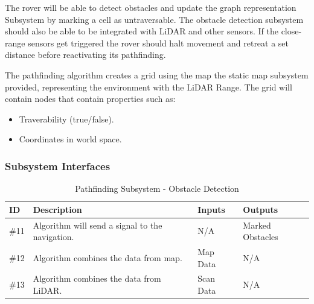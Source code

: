 The rover will be able to detect obstacles and update the graph representation Subsystem by marking a cell as untraversable. The obstacle detection subsystem should also be able to be integrated with LiDAR and other sensors. If the close-range sensors get triggered the rover should halt movement and retreat a set distance before reactivating its pathfinding.

The pathfinding algorithm creates a grid using the map the static map subsystem provided, representing the environment with the LiDAR Range. The grid will contain nodes that contain properties such as: 
\begin{itemize}
  \item Traverability (true/false).
  \item Coordinates in world space.
\end{itemize}
\subsubsection{Subsystem Interfaces}


\begin{table}[H]
\caption{Pathfinding Subsystem - Obstacle Detection} 
\begin{center}
    \begin{tabular}{ | p{1.8cm} | p{8cm} | p{2cm} | p{3cm} |}
    \hline
    ID & Description & Inputs & Outputs  \\ \hline
    \#11 & Algorithm will send a signal to the navigation. & N/A & Marked Obstacles \\ \hline
    \#12 & Algorithm combines the data from map. & Map Data  & N/A \\ \hline
    \#13 & Algorithm combines the data from LiDAR. & Scan Data & N/A \\ \hline
    \end{tabular}
\end{center}
\end{table}


\newpage

